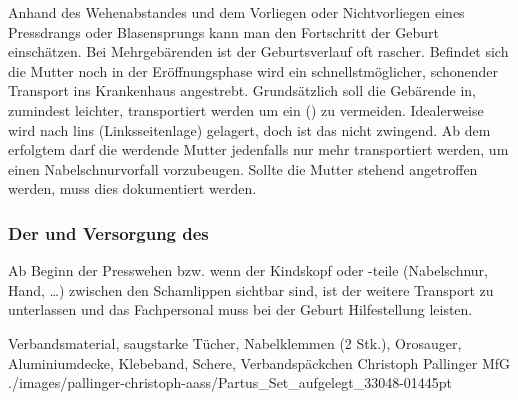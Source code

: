   
{%
Anhand des Wehenabstandes und dem Vorliegen oder
Nichtvorliegen eines Pressdrangs oder Blasensprungs kann
man den Fortschritt der Geburt einschätzen. 
Bei Mehrgebärenden ist der Geburtsverlauf oft rascher. 
Befindet
sich die Mutter noch in der Eröffnungsphase wird ein 
schnellstmöglicher, schonender Transport ins Krankenhaus 
angestrebt. Grundsätzlich soll die Gebärende in,
zumindest leichter,  transportiert werden
um ein 
() zu vermeiden.
Idealerweise wird nach lins (Linksseitenlage) gelagert, doch
ist das nicht zwingend. Ab dem erfolgtem  darf die
werdende Mutter jedenfalls nur mehr 
transportiert werden, um einen Nabelschnurvorfall vorzubeugen.
Sollte die Mutter stehend
angetroffen werden, muss dies dokumentiert werden.
}
{}



\subsubsection{Der  und Versorgung des }


Ab Beginn der Presswehen bzw. wenn der Kindskopf oder -teile
(Nabelschnur, Hand, \ldots) zwischen den Schamlippen
sichtbar sind, ist der weitere Transport zu
unterlassen und das Fachpersonal muss bei der Geburt
Hilfestellung leisten.






{Verbandsmaterial, 
saugstarke Tücher, 
Nabelklemmen (2 Stk.), 
Orosauger, 
Aluminiumdecke, 
Klebeband, 
Schere, 
Verbandspäckchen}%
{\label{fig:partus-set}}%
{Christoph Pallinger}%
{MfG}%
{./images/pallinger-christoph-aass/Partus_Set_aufgelegt_33048-01445pt}%
{}%

